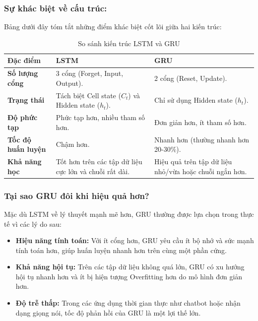 \subsubsection{Sự khác biệt về cấu trúc:} 
Bảng dưới đây tóm tắt những điểm khác biệt cốt lõi giữa hai kiến trúc:

\begin{table}[H]
    \centering
    \begin{tabular}{|p{3cm}|p{5cm}|p{5cm}|}
        \hline
        \textbf{Đặc điểm} & \textbf{LSTM} & \textbf{GRU} \\ \hline
        \textbf{Số lượng cổng} & 3 cổng (Forget, Input, Output). & 2 cổng (Reset, Update). \\ \hline
        \textbf{Trạng thái} & Tách biệt Cell state ($C_t$) và Hidden state ($h_t$). & Chỉ sử dụng Hidden state ($h_t$). \\ \hline
        \textbf{Độ phức tạp} & Phức tạp hơn, nhiều tham số hơn. & Đơn giản hơn, ít tham số hơn. \\ \hline
        \textbf{Tốc độ huấn luyện} & Chậm hơn. & Nhanh hơn (thường nhanh hơn 20-30\%). \\ \hline
        \textbf{Khả năng học} & Tốt hơn trên các tập dữ liệu cực lớn và chuỗi rất dài. & Hiệu quả trên tập dữ liệu nhỏ/vừa hoặc chuỗi ngắn hơn. \\ \hline
    \end{tabular}
    \caption{So sánh kiến trúc LSTM và GRU}
\end{table}

\subsubsection{Tại sao GRU đôi khi hiệu quả hơn?}

Mặc dù LSTM về lý thuyết mạnh mẽ hơn, GRU thường được lựa chọn trong thực tế vì các lý do sau:
\begin{itemize}
    \item \textbf{Hiệu năng tính toán:} Với ít cổng hơn, GRU yêu cầu ít bộ nhớ và sức mạnh tính toán hơn, giúp huấn luyện nhanh hơn trên cùng một phần cứng.
    \item \textbf{Khả năng hội tụ:} Trên các tập dữ liệu không quá lớn, GRU có xu hướng hội tụ nhanh hơn và ít bị hiện tượng Overfitting hơn do mô hình đơn giản hơn.
    \item \textbf{Độ trễ thấp:} Trong các ứng dụng thời gian thực như chatbot hoặc nhận dạng giọng nói, tốc độ phản hồi của GRU là một lợi thế lớn.
\end{itemize}


